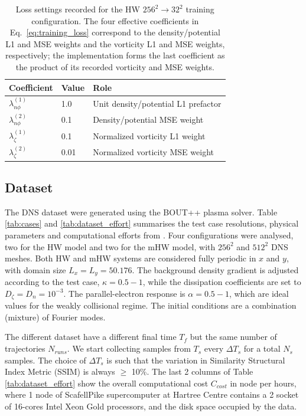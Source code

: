 \documentclass[authoryear,preprint,review,12pt]{elsarticle}
\begin{document}
\begin{table}[ht]
\centering
\caption{Loss settings recorded for the HW $256^2\rightarrow32^2$ training configuration. The four effective coefficients in Eq.~\eqref{eq:training_loss} correspond to the density/potential L1 and MSE weights and the vorticity L1 and MSE weights, respectively; the implementation forms the last coefficient as the product of its recorded vorticity and MSE weights.}
\label{tab:training_loss_weights}
\begin{tabular}{lll}
\toprule
Coefficient & Value & Role \\
\midrule
$\lambda_{n\phi}^{(1)}$ & 1.0 & Unit density/potential L1 prefactor \\
$\lambda_{n\phi}^{(2)}$ & 0.1 & Density/potential MSE weight \\
$\lambda_\zeta^{(1)}$ & 0.1 & Normalized vorticity L1 weight \\
$\lambda_\zeta^{(2)}$ & 0.01 & Normalized vorticity MSE weight \\
\bottomrule
\end{tabular}
\end{table}

\subsection{Dataset}\label{sec:Dataset}

The DNS dataset were generated using the BOUT++ plasma solver. 
Table \ref{tab:cases}
and \ref{tab:dataset_effort} summarises the test case resolutions, physical parameters
and computational efforts from \citet{castagna_stylegan_2024}. Four configurations were analysed, two for the HW model and two for the mHW model, with $256^2$ and $512^2$ DNS meshes. 
Both HW and mHW systems are considered fully periodic in $x$ and $y$, with domain size $L_x=L_y=50.176$. The background density gradient is adjusted according to the test case, $\kappa=0.5 - 1$, while the dissipation coefficients are set to $D_\zeta=D_n=10^{-3}$. The parallel-electron response is $\alpha=0.5 - 1$, which are ideal values for the weakly collisional regime. 
The initial conditions are a combination (mixture) of Fourier modes. 

The different dataset have a different final time $T_f$ but the same number of trajectories $N_{runs}$. We start collecting samples from $T_s$ every $\Delta T_s$ for a total $N_s$ samples. The choice of $\Delta T_s$ is such that the variation in Similarity Structural Index Metric (SSIM) is always $\geq$ 10\%. The last 2 columns of Table \ref{tab:dataset_effort} show the overall computational cost $C_{cost}$ in node per hours, where 1 node of ScafellPike supercomputer at Hartree Centre contains a 2 socket of 16-cores Intel Xeon Gold processors, and the disk space occupied by the data.
\end{document}
